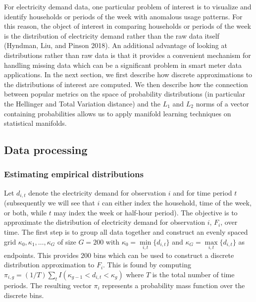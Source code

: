 \documentclass[12pt]{article}
\begin{document}
For electricity demand data, one particular problem of interest is to visualize and identify households or periods of the week with anomalous usage patterns. For this reason, the object of interest in comparing households or periods of the week is the distribution of electricity demand rather than the raw data itself (Hyndman, Liu, and Pinson 2018). An additional advantage of looking at distributions rather than raw data is that it provides a convenient mechanism for handling missing data which can be a significant problem in smart meter data applications. In the next section, we first describe how discrete approximations to the distributions of interest are computed. We then describe how the connection between popular metrics on the space of probability distributions (in particular the Hellinger and Total Variation distance) and the \(L_1\) and \(L_2\) norms of a vector containing probabilities allows us to apply manifold learning techniques on statistical manifolds.

\hypertarget{dataprocessing}{%
\subsection{Data processing}\label{dataprocessing}}

\hypertarget{estimating-empirical-distributions}{%
\subsubsection*{Estimating empirical distributions}\label{estimating-empirical-distributions}}

Let \(d_{i,t}\) denote the electricity demand for observation \(i\) and for time period \(t\) (subsequently we will see that \(i\) can either index the household, time of the week, or both, while \(t\) may index the week or half-hour period). The objective is to approximate the distribution of electricity demand for observation \(i\), \(F_i\), over time. The first step is to group all data together and construct an evenly spaced grid \(\kappa_0,\kappa_1,\dots,\kappa_G\) of size \(G=200\) with \(\kappa_0=\underset{i,t}{\min} \{d_{i,t}\}\) and \(\kappa_G=\underset{i,t}{\max} \{d_{i,t}\}\) as endpoints. This provides \(200\) bins which can be used to construct a discrete distribution approximation to \(F_i\). This is found by computing \(\pi_{i,g}=(1/T)\sum_t I(\kappa_{g-1}<d_{i,t}<\kappa_g)\) where \(T\) is the total number of time periods. The resulting vector \(\pi_i\) represents a probability mass function over the discrete bins.
\end{document}
